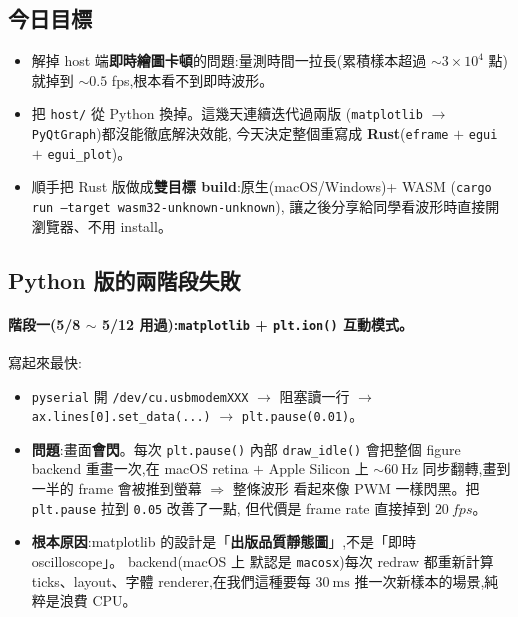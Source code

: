 
\subsection*{今日目標}

\begin{itemize}[leftmargin=2em,itemsep=0pt]
  \item 解掉 host 端\textbf{即時繪圖卡頓}的問題:量測時間一拉長(累積樣本超過 \(\sim 3 \times 10^4\) 點)
        就掉到 \(\sim 0.5\) fps,根本看不到即時波形。
  \item 把 \texttt{host/} 從 Python 換掉。這幾天連續迭代過兩版
        (\texttt{matplotlib} \(\to\) \texttt{PyQtGraph})都沒能徹底解決效能,
        今天決定整個重寫成 \textbf{Rust}(\texttt{eframe} \(+\) \texttt{egui} \(+\) \texttt{egui\_plot})。
  \item 順手把 Rust 版做成\textbf{雙目標 build}:原生(macOS/Windows)+ WASM
        (\texttt{cargo run --target wasm32-unknown-unknown}),
        讓之後分享給同學看波形時直接開瀏覽器、不用 install。
\end{itemize}

\subsection*{Python 版的兩階段失敗}

\paragraph{階段一(5/8 \(\sim\) 5/12 用過):\texttt{matplotlib} + \texttt{plt.ion()} 互動模式。}
寫起來最快:

\begin{itemize}[leftmargin=2em,itemsep=0pt]
  \item \texttt{pyserial} 開 \texttt{/dev/cu.usbmodemXXX} \(\to\) 阻塞讀一行 \(\to\)
        \texttt{ax.lines[0].set\_data(...)} \(\to\) \texttt{plt.pause(0.01)}。
  \item \textbf{問題}:畫面\textbf{會閃}。每次 \texttt{plt.pause()} 內部 \texttt{draw\_idle()}
        會把整個 figure backend 重畫一次,在 macOS retina \(+\) Apple Silicon 上
        \(\sim \SI{60}{\hertz}\) 同步翻轉,畫到一半的 frame 會被推到螢幕 \(\Rightarrow\) 整條波形
        看起來像 PWM 一樣閃黑。把 \texttt{plt.pause} 拉到 \texttt{0.05} 改善了一點,
        但代價是 frame rate 直接掉到 \(\SI{20}{fps}\)。
  \item \textbf{根本原因}:matplotlib 的設計是「\textbf{出版品質靜態圖}」,不是「即時 oscilloscope」。
        backend(macOS 上 默認是 \texttt{macosx})每次 redraw 都重新計算 ticks、layout、字體
        renderer,在我們這種要每 \(\SI{30}{\milli\second}\) 推一次新樣本的場景,純粹是浪費 CPU。
\end{itemize}

